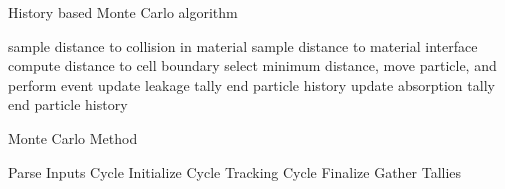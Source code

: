 \begin{algorithm}
\DontPrintSemicolon
\caption{History based Monte Carlo algorithm}
\label{alg:historybased}
{ 
    {
       sample distance to collision in material\;
       sample distance to material interface\;
       compute distance to cell boundary\;
       select minimum distance, move particle, and perform event\;
       {
          update leakage tally\;
          end particle history\;
       }
       {
          update absorption tally\;
          end particle history\;
       }
    }
}
\end{algorithm}

\begin{algorithm}
\DontPrintSemicolon
\caption{Monte Carlo Method}
\label{alg:mcmethod}
Parse Inputs\;
{
	Cycle Initialize\;
	Cycle Tracking\;
	Cycle Finalize\;
}
Gather Tallies\;
\end{algorithm}




